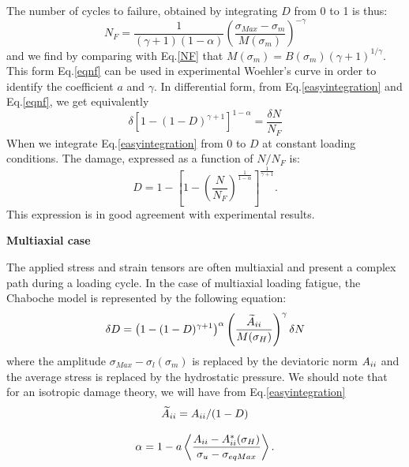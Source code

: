The number of cycles to failure, obtained by integrating $D$ from 0 to 1 is thus:
\begin{equation}N_F=\frac{1}{(\gamma+1)(1-\alpha)}\left(\frac{\sigma_{Max}-\sigma_m}{M(\sigma_m)}\right)^{-\gamma}
\label{eqnf}
\end{equation}
and we find by comparing with Eq.\eqref{NF} that $M(\sigma_m)=B(\sigma_m)(\gamma+1)^{1/\gamma}$. This form Eq.\eqref{eqnf} can be used in experimental Woehler's curve in order to identify the coefficient $a$ and $\gamma$. In differential form,  from Eq.\eqref{easyintegration} and Eq.\eqref{eqnf}, we get equivalently
\begin{equation}\delta [1-(1-D)^{\gamma+1}]^{1-\alpha}=\frac{\delta N}{N_F}
\label{diffform}
\end{equation}
When we integrate Eq.\eqref{easyintegration} from $0$ to $D$ at constant loading conditions. The damage, expressed as a function of $N/N_F$ is:
\begin{equation}D=1-\left[ 1-\left( \frac{N}{N_F}\right) ^{\frac{1}{1-\alpha}}\right] ^{\frac{1}{\gamma+1}}.
\end{equation}
This expression is in good agreement with experimental results\cite{lemaitre1990mechanics}. 

\vspace{6pt}
\textbf{Multiaxial case}
\vspace{6pt}

The applied stress and strain tensors are often multiaxial and present a complex path during a loading cycle. In the case of multiaxial loading fatigue, the Chaboche model is represented by the following equation:
\begin{equation}\delta D = \left( 1 -(1-D)^{\gamma+1}\right)^\alpha \left(\frac{\widetilde{A}_{\uppercase\expandafter{\romannumeral2}}}{M(\sigma_H)}\right)^\gamma \delta N
\label{chabochemulti}
\end{equation} 
where the amplitude $\sigma_{Max}-\sigma_l(\sigma_m)$ is replaced by the deviatoric norm $A_{\uppercase\expandafter{\romannumeral2}}$ and the average stress is replaced by the hydrostatic pressure. We should note that for an isotropic damage theory, we will have from Eq.\eqref{easyintegration}
$$\widetilde{A}_{\uppercase\expandafter{\romannumeral2}}=A_{\uppercase\expandafter{\romannumeral2}}/(1-D)$$

\begin{equation}\alpha = 1 - a\left\langle \frac{A_{\uppercase\expandafter{\romannumeral2}} - A_{\uppercase\expandafter{\romannumeral2}}^\ast(\sigma_H)}{ \sigma_{u} - \sigma_{eqMax}}\right\rangle.\end{equation}

